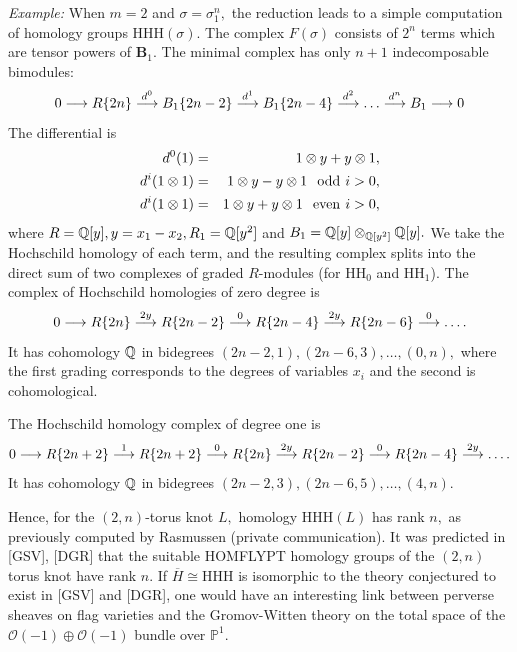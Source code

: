 \documentclass[12pt]{article}
\begin{document}
\emph{Example:} When $m=2$ and $\sigma=\sigma_1^n,$ the 
reduction leads to a simple computation of homology groups $\mathrm{HHH}(\sigma).$ 
The complex $F(\sigma)$ consists 
of $2^n$ terms which are tensor powers of $\mathbf{B}_1.$ 
The minimal complex has only $n+1$ indecomposable bimodules: 
$$ 0 \longrightarrow R\{2n\} \stackrel{d^0}{\longrightarrow} B_1\{2n-2\} \stackrel{d^1}{\longrightarrow} 
B_1 \{ 2n-4\} \stackrel{d^2}{\longrightarrow} \dots \stackrel{d^n}{\longrightarrow} B_1 \longrightarrow 0 $$ 
The differential is 
\begin{eqnarray*} 
   d^0(1) & = & 1\otimes y + y \otimes 1 , \\
   d^i (1\otimes 1) & = & 1\otimes y - y \otimes 1 \hspace{0.1in} \mathrm{odd} \hspace{0.05in} 
   i>0 , \\
    d^i (1\otimes 1) & = & 1\otimes y + y \otimes 1 \hspace{0.1in} \mathrm{even} 
   \hspace{0.05in}  i>0, 
\end{eqnarray*} 
where $R= \mathbb Q[y], y=x_1-x_2, R_1= \mathbb Q[y^2]$ and $B_1=\mathbb Q[y]\otimes_{\mathbb Q[y^2]}
 \mathbb Q[y].$ We take the Hochschild homology of each term, and the resulting 
complex splits into the direct sum of two complexes of graded $R$-modules 
(for $\mathrm{HH}_0$ and $\mathrm{HH}_1$). The complex of Hochschild 
homologies of zero degree is  
$$ 0 \longrightarrow R\{2n\} \stackrel{2y}{\longrightarrow} R\{2n-2\} \stackrel{0}{\longrightarrow}
R\{2n-4\}\stackrel{2y}{\longrightarrow} R\{2n-6\}    \stackrel{0}{\longrightarrow} \dots. $$ 
It has cohomology $\mathbb Q$ in bidegrees $(2n-2, 1), (2n-6, 3), \dots, (0,n),$ 
where the first grading corresponds to the degrees of variables $x_i$ and 
the second is cohomological. 

The Hochschild homology complex of degree one is  
$$ 0 \longrightarrow R\{2n+2\} \stackrel{1}{\longrightarrow} R\{2n+2\} \stackrel{0}{\longrightarrow}
R\{2n\}\stackrel{2y}{\longrightarrow} R\{2n-2\} \stackrel{0}{\longrightarrow} R\{2n-4\}
\stackrel{2y}{\longrightarrow} \dots. $$ 
   It has cohomology $\mathbb Q$ in bidegrees $(2n-2, 3), (2n-6, 5), \dots, (4, n).$ 

Hence, for the $(2,n)$-torus knot $L,$ homology $\mathrm{HHH}(L)$ 
has rank $n,$ as previously computed 
by Rasmussen (private communication). It was predicted in 
[GSV], [DGR] that the suitable HOMFLYPT homology groups of the $(2,n)$ torus
knot have rank $n.$ If $\overline{H}\cong \mathrm{HHH}$ 
is isomorphic to the theory conjectured to exist in [GSV] and [DGR], one 
would have an interesting link between perverse sheaves on flag varieties 
and the Gromov-Witten theory on the total space of the 
$\mathcal{O}(-1)\oplus  \mathcal{O}(-1)$ bundle over $\mathbb{P}^1.$ 
\end{document}
